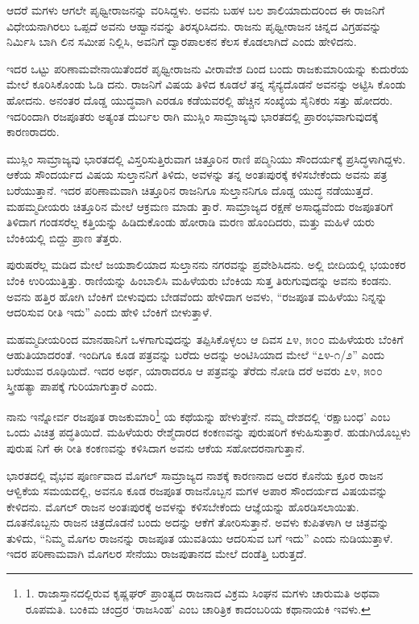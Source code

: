 ಆದರೆ ಮಗಳು ಆಗಲೇ ಪೃಥ್ವೀರಾಜನನ್ನು ವರಿಸಿದ್ದಳು. ಅವನು ಬಹಳ ಬಲ ಶಾಲಿಯಾದುದರಿಂದ ಈ ರಾಜನಿಗೆ ವಿಧೇಯನಾಗಿರಲು ಒಪ್ಪದೆ ಅವನು ಆಹ್ವಾನವನ್ನು ತಿರಸ್ಕರಿಸಿದನು. ರಾಜನು ಪೃಥ್ವೀರಾಜನ ಚಿನ್ನದ ವಿಗ್ರಹವನ್ನು ನಿರ್ಮಿಸಿ ಬಾಗಿ ಲಿನ ಸಮೀಪ ನಿಲ್ಲಿಸಿ, ಅವನಿಗೆ ದ್ವಾರಪಾಲಕನ ಕೆಲಸ ಕೊಡಲಾಗಿದೆ ಎಂದು ಹೇಳಿದನು.

ಇದರ ಒಟ್ಟು ಪರಿಣಾಮವೇನಾಯಿತೆಂದರೆ ಪೃಥ್ವೀರಾಜನು ವೀರಾವೇಶ ದಿಂದ ಬಂದು ರಾಜಕುಮಾರಿಯನ್ನು ಕುದುರೆಯ ಮೇಲೆ ಕೂರಿಸಿಕೊಂಡು ಓಡಿ ದನು. ರಾಜನಿಗೆ ವಿಷಯ ತಿಳಿದ ಕೂಡಲೆ ತನ್ನ ಸೈನ್ಯದೊಡನೆ ಅವನನ್ನು ಅಟ್ಟಿಸಿ ಕೊಂಡು ಹೋದನು. ಅನಂತರ ದೊಡ್ಡ ಯುದ್ಧವಾಗಿ ಎರಡೂ ಕಡೆಯವರಲ್ಲಿ ಹೆಚ್ಚಿನ ಸಂಖ್ಯೆಯ ಸೈನಿಕರು ಸತ್ತು ಹೋದರು. ಇದರಿಂದಾಗಿ ರಜಪೂತರು ಅತ್ಯಂತ ದುರ್ಬಲ ರಾಗಿ ಮುಸ್ಲಿಂ ಸಾಮ್ರಾಜ್ಯವು ಭಾರತದಲ್ಲಿ ಪ್ರಾರಂಭವಾಗುವುದಕ್ಕೆ ಕಾರಣರಾದರು.

ಮುಸ್ಲಿಂ ಸಾಮ್ರಾಜ್ಯವು ಭಾರತದಲ್ಲಿ ವಿಸ್ತರಿಸುತ್ತಿರುವಾಗ ಚಿತ್ತೂರಿನ ರಾಣಿ ಪದ್ಮಿನಿಯು ಸೌಂದರ್ಯಕ್ಕೆ ಪ್ರಸಿದ್ಧಳಾಗಿದ್ದಳು. ಆಕೆಯ ಸೌಂದರ್ಯದ ವಿಷಯ ಸುಲ್ತಾನನಿಗೆ ತಿಳಿದು, ಅವಳನ್ನು ತನ್ನ ಅಂತಃಪುರಕ್ಕೆ ಕಳಿಸಬೇಕೆಂದು ಅವನು ಪತ್ರ ಬರೆಯುತ್ತಾನೆ. ಇದರ ಪರಿಣಾಮವಾಗಿ ಚಿತ್ತೂರಿನ ರಾಜನಿಗೂ ಸುಲ್ತಾನನಿಗೂ ದೊಡ್ಡ ಯುದ್ಧ ನಡೆಯುತ್ತದೆ. ಮಹಮ್ಮದೀಯರು ಚಿತ್ತೂರಿನ ಮೇಲೆ ಆಕ್ರಮಣ ಮಾಡು ತ್ತಾರೆ. ಸಾಮ್ರಾಜ್ಯದ ರಕ್ಷಣೆ ಅಸಾಧ್ಯವೆಂದು ರಜಪೂತರಿಗೆ ತಿಳಿದಾಗ ಗಂಡಸರೆಲ್ಲ ಕತ್ತಿಯನ್ನು ಹಿಡಿದುಕೊಂಡು ಹೋರಾಡಿ ಮರಣ ಹೊಂದಿದರು, ಮತ್ತು ಮಹಿಳೆ ಯರು ಬೆಂಕಿಯಲ್ಲಿ ಬಿದ್ದು ಪ್ರಾಣ ತೆತ್ತರು.

ಪುರುಷರೆಲ್ಲ ಮಡಿದ ಮೇಲೆ ಜಯಶಾಲಿಯಾದ ಸುಲ್ತಾನನು ನಗರವನ್ನು ಪ್ರವೇಶಿಸಿದನು. ಅಲ್ಲಿ ಬೀದಿಯಲ್ಲಿ ಭಯಂಕರ ಬೆಂಕಿ ಉರಿಯುತ್ತಿತ್ತು. ರಾಣಿಯನ್ನು ಹಿಂಬಾಲಿಸಿ ಮಹಿಳೆಯರು ಬೆಂಕಿಯ ಸುತ್ತ ತಿರುಗುವುದನ್ನು ಅವನು ಕಂಡನು. ಅವನು ಹತ್ತಿರ ಹೋಗಿ ಬೆಂಕಿಗೆ ಬೀಳುವುದು ಬೇಡವೆಂದು ಹೇಳಿದಾಗ ಅವಳು, “ರಜಪೂತ ಮಹಿಳೆಯು ನಿನ್ನನ್ನು ಆದರಿಸುವ ರೀತಿ ಇದು” ಎಂದು ಹೇಳಿ ಬೆಂಕಿಗೆ ಬೀಳುತ್ತಾಳೆ.

ಮಹಮ್ಮದೀಯರಿಂದ ಮಾನಹಾನಿಗೆ ಒಳಗಾಗುವುದನ್ನು ತಪ್ಪಿಸಿಕೊಳ್ಳಲು ಆ ದಿವಸ ೭೪, ೫೦೦ ಮಹಿಳೆಯರು ಬೆಂಕಿಗೆ ಆಹುತಿಯಾದರಂತೆ. ಇಂದಿಗೂ ಕೂಡ ಪತ್ರವನ್ನು ಬರೆದು ಅದನ್ನು ಅಂಟಿಸಿಯಾದ ಮೇಲೆ “೭೪-೧/೨” ಎಂದು ಬರೆಯುವ ರೂಢಿಯಿದೆ. ಇದರ ಅರ್ಥ, ಯಾರಾದರೂ ಆ ಪತ್ರವನ್ನು ತೆರೆದು ನೋಡಿ ದರೆ ಅವರು ೭೪, ೫೦೦ ಸ್ತ್ರೀಹತ್ಯಾ ಪಾಪಕ್ಕೆ ಗುರಿಯಾಗುತ್ತಾರೆ ಎಂದು.

ನಾನು ಇನ್ನೋರ್ವ ರಜಪೂತ ರಾಜಕುಮಾರಿ\footnote{1. ರಾಜಾಸ್ತಾನದಲ್ಲಿರುವ ಕೃಷ್ಣಘರ್ ಪ್ರಾಂತ್ಯದ ರಾಜನಾದ ವಿಕ್ರಮ ಸಿಂಘನ ಮಗಳು ಚಾರುಮತಿ ಅಥವಾ ರೂಪಮತಿ. ಬಂಕಿಮ ಚಂದ್ರರ ‘ರಾಜಸಿಂಹ’ ಎಂಬ ಚಾರಿತ್ರಿಕ ಕಾದಂಬರಿಯ ಕಥಾನಾಯಕಿ ಇವಳು.} ಯ ಕಥೆಯನ್ನು ಹೇಳುತ್ತೇನೆ. ನಮ್ಮ ದೇಶದಲ್ಲಿ ‘ರಕ್ಷಾಬಂಧ’ ಎಂಬ ಒಂದು ವಿಚಿತ್ರ ಪದ್ಧತಿಯಿದೆ. ಮಹಿಳೆಯರು ರೇಶ್ಮೆದಾರದ ಕಂಕಣವನ್ನು ಪುರುಷರಿಗೆ ಕಳುಹಿಸುತ್ತಾರೆ. ಹುಡುಗಿಯೊಬ್ಬಳು ಪುರುಷ ನಿಗೆ ಈ ರೀತಿ ಕಂಕಣವನ್ನು ಕಳಿಸಿದಾಗ ಅವನು ಆಕೆಯ ಸಹೋದರನಾಗುತ್ತಾನೆ.

ಭಾರತದಲ್ಲಿ ವೈಭವ ಪೂರ್ಣವಾದ ಮೊಗಲ್ ಸಾಮ್ರಾಜ್ಯದ ನಾಶಕ್ಕೆ ಕಾರಣನಾದ ಅದರ ಕೊನೆಯ ಕ್ರೂರ ರಾಜನ ಆಳ್ವಿಕೆಯ ಸಮಯದಲ್ಲಿ, ಅವನೂ ಕೂಡ ರಜಪೂತ ರಾಜನೊಬ್ಬನ ಮಗಳ ಅಪಾರ ಸೌಂದರ್ಯದ ವಿಷಯವನ್ನು ಕೇಳಿದನು. ಮೊಗಲ್ ರಾಜನ ಅಂತಃಪುರಕ್ಕೆ ಅವಳನ್ನು ಕಳಿಸಬೇಕೆಂದು ಆಜ್ಞೆಯನ್ನು ಹೊರಡಿಸಲಾಯಿತು. ದೂತನೊಬ್ಬನು ರಾಜನ ಚಿತ್ರದೊಡನೆ ಬಂದು ಅದನ್ನು ಆಕೆಗೆ ತೋರಿಸುತ್ತಾನೆ. ಅವಳು ಕುಪಿತಳಾಗಿ ಆ ಚಿತ್ರವನ್ನು ತುಳಿದು, “ನಿಮ್ಮ ಮೊಗಲ ರಾಜನನ್ನು ರಾಜಪೂತ ಯುವತಿಯು ಆದರಿಸುವ ಬಗೆ ಇದು” ಎಂದು ನುಡಿಯುತ್ತಾಳೆ. ಇದರ ಪರಿಣಾಮವಾಗಿ ಮೊಗಲರ ಸೇನೆಯು ರಾಜಪುತಾನದ ಮೇಲೆ ದಂಡೆತ್ತಿ ಬರುತ್ತದೆ.

